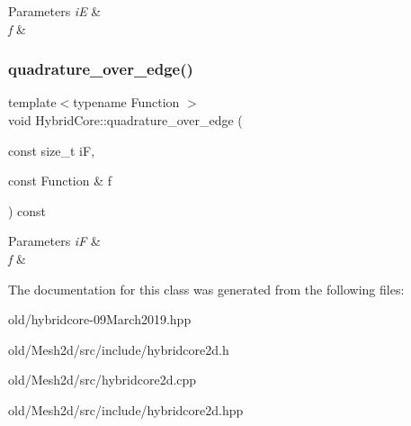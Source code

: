 \begin{DoxyParams}{Parameters}
{\em iE} & \\
\hline
{\em f} & \\
\hline
\end{DoxyParams}
\mbox{\label{classMeshFramework2D_1_1HybridCore_a7d23f6ca5a8fc8139f4b6670eabf6f49}} 
\subsubsection{\texorpdfstring{quadrature\+\_\+over\+\_\+edge()}{quadrature\_over\_edge()}\hspace{0.1cm}{\footnotesize\ttfamily [2/2]}}
{\footnotesize\ttfamily template$<$typename Function $>$ \\
void Hybrid\+Core\+::quadrature\+\_\+over\+\_\+edge (\begin{DoxyParamCaption}\item[{const size\+\_\+t}]{iF,  }\item[{const Function \&}]{f }\end{DoxyParamCaption}) const}


\begin{DoxyParams}{Parameters}
{\em iF} & \\
\hline
{\em f} & \\
\hline
\end{DoxyParams}


The documentation for this class was generated from the following files\+:\begin{DoxyCompactItemize}
\item 
old/hybridcore-\/09\+March2019.\+hpp\item 
old/\+Mesh2d/src/include/hybridcore2d.\+h\item 
old/\+Mesh2d/src/hybridcore2d.\+cpp\item 
old/\+Mesh2d/src/include/hybridcore2d.\+hpp\end{DoxyCompactItemize}
